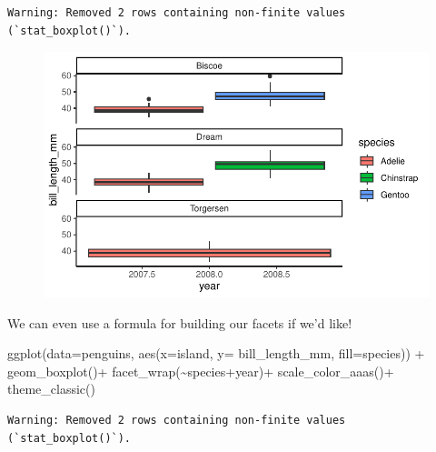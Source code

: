 \documentclass[
  letterpaper,
  DIV=11,
  numbers=noendperiod]{scrartcl}
\newenvironment{Shaded}{\begin{snugshade}}{\end{snugshade}}
\newcommand{\AttributeTok}[1]{\textcolor[rgb]{0.40,0.45,0.13}{#1}}
\newcommand{\FunctionTok}[1]{\textcolor[rgb]{0.28,0.35,0.67}{#1}}
\newcommand{\NormalTok}[1]{\textcolor[rgb]{0.00,0.23,0.31}{#1}}
\newcommand{\SpecialCharTok}[1]{\textcolor[rgb]{0.37,0.37,0.37}{#1}}
\begin{document}
\begin{verbatim}
Warning: Removed 2 rows containing non-finite values (`stat_boxplot()`).
\end{verbatim}

\begin{figure}[H]

{\centering \includegraphics{facets_files/figure-pdf/unnamed-chunk-4-1.pdf}

}

\end{figure}

We can even use a formula for building our facets if we'd like!

\begin{Shaded}
\begin{Highlighting}[]
\FunctionTok{ggplot}\NormalTok{(}\AttributeTok{data=}\NormalTok{penguins, }\FunctionTok{aes}\NormalTok{(}\AttributeTok{x=}\NormalTok{island, }\AttributeTok{y=}\NormalTok{ bill\_length\_mm, }\AttributeTok{fill=}\NormalTok{species)) }\SpecialCharTok{+}
  \FunctionTok{geom\_boxplot}\NormalTok{()}\SpecialCharTok{+}
  \FunctionTok{facet\_wrap}\NormalTok{(}\SpecialCharTok{\textasciitilde{}}\NormalTok{species}\SpecialCharTok{+}\NormalTok{year)}\SpecialCharTok{+}
  \FunctionTok{scale\_color\_aaas}\NormalTok{()}\SpecialCharTok{+}
  \FunctionTok{theme\_classic}\NormalTok{()}
\end{Highlighting}
\end{Shaded}

\begin{verbatim}
Warning: Removed 2 rows containing non-finite values (`stat_boxplot()`).
\end{verbatim}
\end{document}
